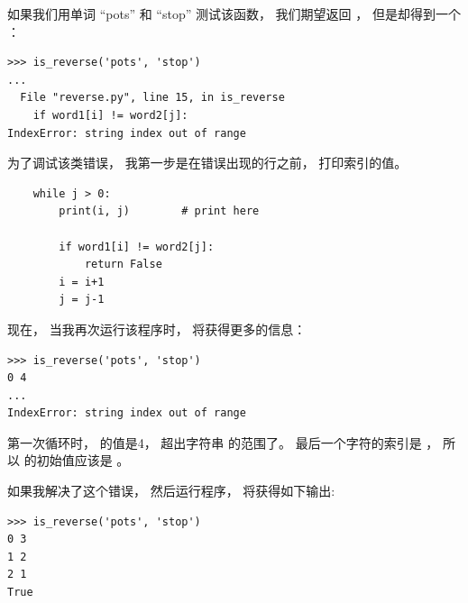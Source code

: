   

如果我们用单词 ``pots'' 和 ``stop'' 测试该函数， 我们期望返回  ， 但是却得到一个 ：

\begin{lstlisting}
>>> is_reverse('pots', 'stop')
...
  File "reverse.py", line 15, in is_reverse
    if word1[i] != word2[j]:
IndexError: string index out of range
\end{lstlisting}

%

为了调试该类错误， 我第一步是在错误出现的行之前， 打印索引的值。

\begin{lstlisting}
    while j > 0:
        print(i, j)        # print here

        if word1[i] != word2[j]:
            return False
        i = i+1
        j = j-1
\end{lstlisting}

%

现在， 当我再次运行该程序时， 将获得更多的信息：

\begin{lstlisting}
>>> is_reverse('pots', 'stop')
0 4
...
IndexError: string index out of range
\end{lstlisting}

%

第一次循环时，  的值是4， 超出字符串  的范围了。  最后一个字符的索引是 ， 所以  的初始值应该是  。


如果我解决了这个错误， 然后运行程序， 将获得如下输出:

\begin{lstlisting}
>>> is_reverse('pots', 'stop')
0 3
1 2
2 1
True
\end{lstlisting}

